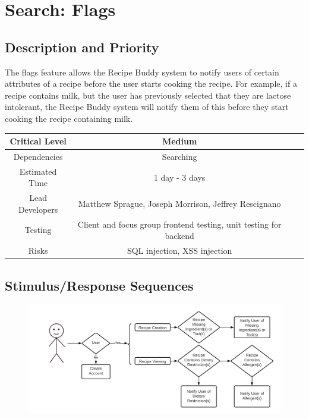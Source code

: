 \documentclass{scrreprt}
\begin{document}
\section{Search: Flags}

\subsection{Description and Priority}

The flags feature allows the Recipe Buddy system to notify users of certain attributes of a recipe before the user starts cooking the recipe. For example, if a recipe contains milk, but the user has previously selected that they are lactose intolerant, the Recipe Buddy system will notify them of this before they start cooking the recipe containing milk.

\begin{center}
    \begin{tabular}{| c | c | c | c |}
        \hline
        Critical Level  & Medium                                                            \\
        \hline
        Dependencies    & Searching                                                         \\
        \hline
        Estimated Time  & 1 day - 3 days                                                    \\
        \hline
        Lead Developers & Matthew Sprague, Joseph Morrison, Jeffrey Rescignano              \\
        \hline
        Testing         & Client and focus group frontend testing, unit testing for backend \\
        \hline
        Risks           & SQL injection, XSS injection                                      \\
        \hline
    \end{tabular}
\end{center}

\subsection{Stimulus/Response Sequences}

\begin{figure}[H]\centering
    \includegraphics[width=\columnwidth]{FlowCharts/Search-Flags.png}
\end{figure}
\end{document}
